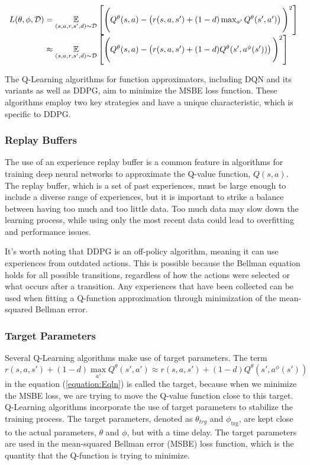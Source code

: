 \begin{equation}\label{equation:Eqln}
\begin{array}{l@{}l}
L(\theta,\phi, {\mathcal D}) &{}= \underset{(s,a,r,s',d) \sim {\mathcal D}}{{\mathbb E}}\left[
    \Bigg( Q^{\theta}(s,a) - \left(r(s,a,s') +(1 - d) \max_{a'} Q^{\theta}(s',a') \right) \Bigg)^2
    \right]\\
    &{}\approx \underset{(s,a,r,s',d) \sim {\mathcal D}}{{\mathbb E}}\left[
    \Bigg( Q^{\theta}(s,a) - \left(r(s,a,s') +(1 - d) Q^{\theta}(s',a^\phi(s')) \right) \Bigg)^2
    \right]
\end{array}
\end{equation}

The Q-Learning algorithms for function approximators, including DQN and its variants as well as  DDPG, aim to minimize the MSBE loss function. These algorithms employ two key strategies and have a unique characteristic, which is specific to DDPG.

\subsubsection{Replay Buffers}

The use of an experience replay buffer is a common feature in algorithms for training deep neural networks to approximate the Q-value function, $Q(s,a)$. The replay buffer, which is a set of past experiences, must be large enough to include a diverse range of experiences, but it is important to strike a balance between having too much and too little data. Too much data may slow down the learning process, while using only the most recent data could lead to overfitting and performance issues.

It's worth noting that DDPG is an off-policy algorithm, meaning it can use experiences from outdated actions. This is possible because the Bellman equation holds for all possible transitions, regardless of how the actions were selected or what occurs after a transition. Any experiences that have been collected can be used when fitting a Q-function approximation through minimization of the mean-squared Bellman error.

\subsubsection{Target Parameters}

Several Q-Learning algorithms make use of target parameters. The term 
\begin{equation}
r(s,a,s') +(1 - d)\max_{a'} Q^{\theta}(s',a') \approx  r(s,a,s') +(1 - d) Q^{\theta}(s',a^\phi(s'))
\end{equation}
in the equation (\ref{equation:Eqln}) is called the target, because when we minimize the MSBE loss, we are trying to move the Q-value function close to this target. Q-Learning algorithms incorporate the use of target parameters to stabilize the training process. The target parameters, denoted as $\theta_{trg}$ and $\phi_{\text{trg}}$, are kept close to the actual parameters, $\theta$ and $\phi$, but with a time delay. The target parameters are used in the mean-squared Bellman error (MSBE) loss function, which is the quantity that the Q-function is trying to minimize.

